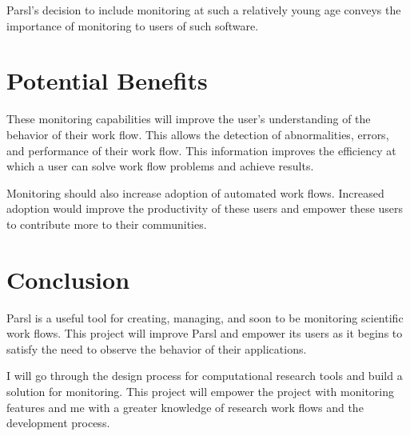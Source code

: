 \documentclass{article}
\begin{document}
Parsl's decision to include monitoring at such a relatively young age conveys the importance of monitoring to users of such software.

\section{Potential Benefits}
These monitoring capabilities will improve the user's understanding of the behavior of their work flow.
This allows the detection of abnormalities, errors, and performance of their work flow.
This information improves the efficiency at which a user can solve work flow problems and achieve results.

Monitoring should also increase adoption of automated work flows.
Increased adoption would improve the productivity of these users and empower these users to contribute more to their communities.

\section{Conclusion}
Parsl is a useful tool for creating, managing, and soon to be monitoring scientific work flows.
This project will improve Parsl and empower its users as it begins to satisfy the need to observe the behavior of their applications.

I will go through the design process for computational research tools and build a solution for monitoring.
This project will empower the project with monitoring features and me with a greater knowledge of research work flows and the development process.



\end{document}
